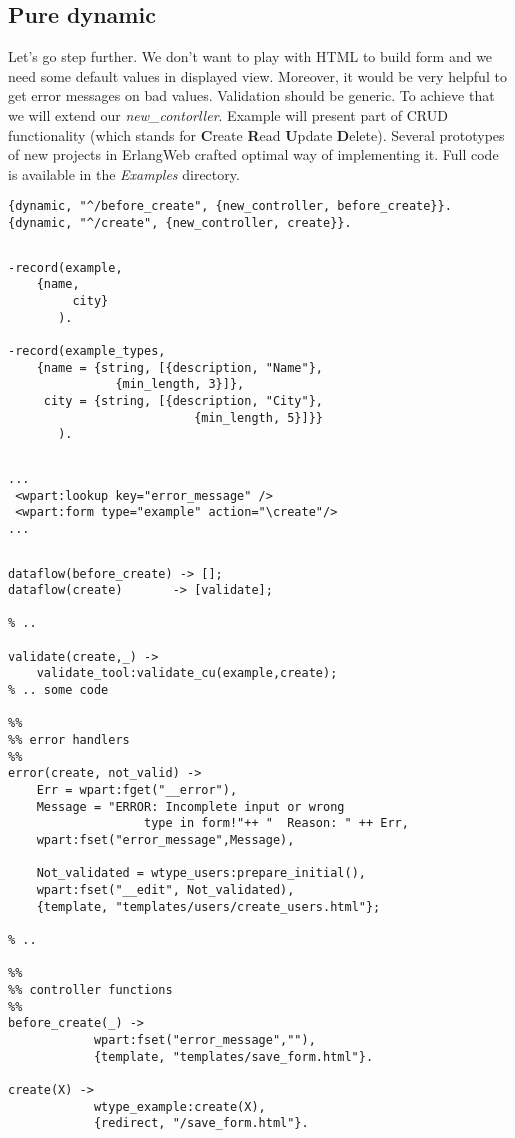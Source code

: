 \subsection{Pure dynamic}
Let's go step further. We don't want to play with HTML to build form and we
need some default values in displayed view. Moreover, it would be very helpful to get
error messages on bad values. Validation should be generic. To achieve that we will extend our
\emph{new\_contorller}. Example will present part of CRUD functionality (which
stands for {\bf C}reate {\bf R}ead {\bf U}pdate {\bf D}elete). Several prototypes of new projects in
ErlangWeb crafted optimal way of implementing it. Full code is available in the
{\it Examples} directory.

\begin{Verbatim}[frame=single,
       framesep=2mm,
       label=dispacher.conf,labelposition=topline,
       fontsize=\small]
{dynamic, "^/before_create", {new_controller, before_create}}.
{dynamic, "^/create", {new_controller, create}}.
\end{Verbatim}
$ $
\begin{Verbatim}[frame=single,
       framesep=2mm,
       label=example\_records.hrl,labelposition=topline,
       fontsize=\small]
-record(example, 
	{name,
         city}
       ).

-record(example_types, 
	{name = {string, [{description, "Name"},
			   {min_length, 3}]},
	 city = {string, [{description, "City"},
                          {min_length, 5}]}}
       ).
\end{Verbatim}
$ $
\begin{Verbatim}[frame=single,
       framesep=2mm,
       label=save\_form.html,labelposition=topline,fontsize=\small]
...
 <wpart:lookup key="error_message" />
 <wpart:form type="example" action="\create"/> 
...
\end{Verbatim}
$ $
\begin{Verbatim}[frame=single,fontsize=\small,
       framesep=2mm,
       label=new\_controller.erl,labelposition=topline]
dataflow(before_create) -> [];
dataflow(create)       -> [validate];

% ..

validate(create,_) ->
	validate_tool:validate_cu(example,create);
% .. some code

%%
%% error handlers
%%
error(create, not_valid) ->
	Err = wpart:fget("__error"),
 	Message = "ERROR: Incomplete input or wrong 
                   type in form!"++ "  Reason: " ++ Err,
	wpart:fset("error_message",Message),

	Not_validated = wtype_users:prepare_initial(),
	wpart:fset("__edit", Not_validated),
	{template, "templates/users/create_users.html"};

% ..

%%
%% controller functions
%%
before_create(_) ->
            wpart:fset("error_message",""),
            {template, "templates/save_form.html"}.

create(X) -> 
            wtype_example:create(X),
            {redirect, "/save_form.html"}.
\end{Verbatim}

